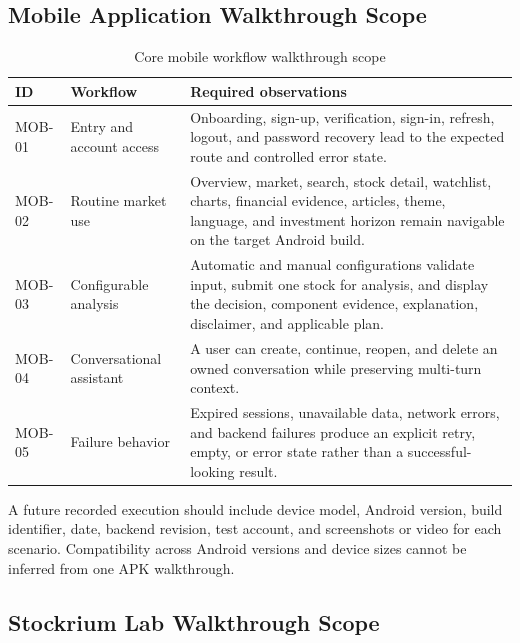 \subsection{Mobile Application Walkthrough Scope}
\label{subsec:mobile-walkthrough-scope}

\begin{table}[H]
    \centering
    \caption{Core mobile workflow walkthrough scope}
    \label{tab:mobile-walkthrough-scope}
    \footnotesize
    \begin{tabularx}{\textwidth}{>{\raggedright\arraybackslash}p{1.35cm} >{\raggedright\arraybackslash}p{3.1cm} X}
        \toprule
        \textbf{ID} & \textbf{Workflow} & \textbf{Required observations} \\
        \midrule
        MOB-01 & Entry and account access & Onboarding, sign-up, verification, sign-in, refresh, logout, and password recovery lead to the expected route and controlled error state. \\
        \addlinespace
        MOB-02 & Routine market use & Overview, market, search, stock detail, watchlist, charts, financial evidence, articles, theme, language, and investment horizon remain navigable on the target Android build. \\
        \addlinespace
        MOB-03 & Configurable analysis & Automatic and manual configurations validate input, submit one stock for analysis, and display the decision, component evidence, explanation, disclaimer, and applicable plan. \\
        \addlinespace
        MOB-04 & Conversational assistant & A user can create, continue, reopen, and delete an owned conversation while preserving multi-turn context. \\
        \addlinespace
        MOB-05 & Failure behavior & Expired sessions, unavailable data, network errors, and backend failures produce an explicit retry, empty, or error state rather than a successful-looking result. \\
        \bottomrule
    \end{tabularx}
\end{table}

A future recorded execution should include device model, Android version, build identifier, date, backend revision, test account, and screenshots or video for each scenario. Compatibility across Android versions and device sizes cannot be inferred from one APK walkthrough.

\subsection{Stockrium Lab Walkthrough Scope}
\label{subsec:stockrium-lab-walkthrough-scope}


